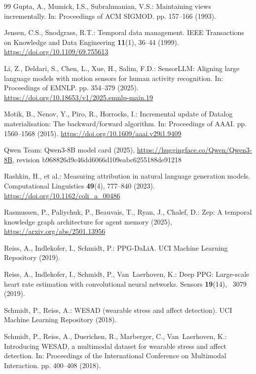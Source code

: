\documentclass[runningheads]{llncs}
\begin{document}
\begin{thebibliography}{99}
Gupta, A., Mumick, I.S., Subrahmanian, V.S.: Maintaining views incrementally.
  In: Proceedings of ACM SIGMOD. pp. 157--166 (1993).

Jensen, C.S., Snodgrass, R.T.: Temporal data management. IEEE Transactions on
Knowledge and Data Engineering \textbf{11}(1), 36--44 (1999).
\url{https://doi.org/10.1109/69.755613}

Li, Z., Deldari, S., Chen, L., Xue, H., Salim, F.D.: SensorLLM: Aligning large
language models with motion sensors for human activity recognition. In:
Proceedings of EMNLP. pp. 354--379 (2025).
\url{https://doi.org/10.18653/v1/2025.emnlp-main.19}

Motik, B., Nenov, Y., Piro, R., Horrocks, I.: Incremental update of Datalog
materialisation: The backward/forward algorithm. In: Proceedings of AAAI.
pp. 1560--1568 (2015). \url{https://doi.org/10.1609/aaai.v29i1.9409}

{Qwen Team}: {Qwen3-8B} model card (2025),
  \url{https://huggingface.co/Qwen/Qwen3-8B}, revision
  b968826d9c46dd6066d109eabc6255188de91218

Rashkin, H., et al.: Measuring attribution in natural language generation
models. Computational Linguistics \textbf{49}(4), 777--840 (2023).
\url{https://doi.org/10.1162/coli_a_00486}

Rasmussen, P., Paliychuk, P., Beauvais, T., Ryan, J., Chalef, D.: Zep: A
  temporal knowledge graph architecture for agent memory (2025),
  \url{https://arxiv.org/abs/2501.13956}

Reiss, A., Indlekofer, I., Schmidt, P.: {PPG-DaLiA}. UCI Machine Learning
  Repository (2019). 

Reiss, A., Indlekofer, I., Schmidt, P., Van~Laerhoven, K.: Deep {PPG}:
  Large-scale heart rate estimation with convolutional neural networks. Sensors
   \textbf{19}(14), ~3079 (2019). 

Schmidt, P., Reiss, A.: {WESAD} (wearable stress and affect detection). UCI
  Machine Learning Repository (2018). 

Schmidt, P., Reiss, A., Duerichen, R., Marberger, C., Van~Laerhoven, K.:
  Introducing {WESAD}, a multimodal dataset for wearable stress and affect
  detection. In: Proceedings of the International Conference on Multimodal
  Interaction. pp. 400--408 (2018). 


\end{thebibliography}
\end{document}
